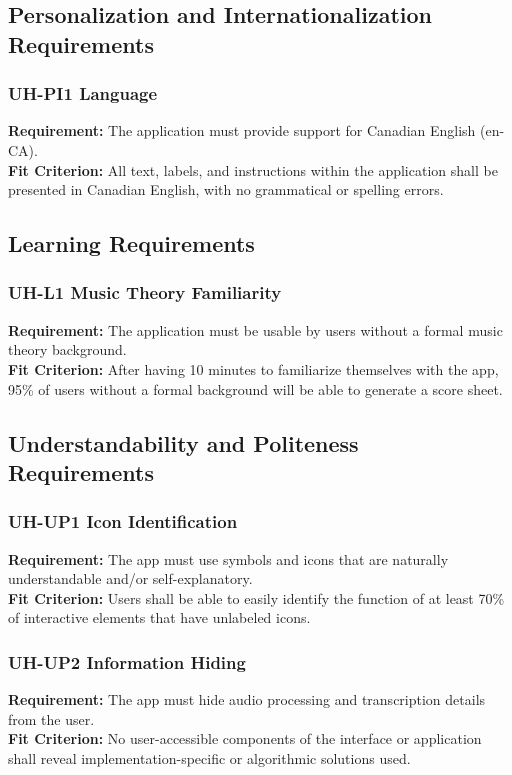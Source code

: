\documentclass[12pt]{article}
\begin{document}
\subsection{Personalization and Internationalization Requirements}
\subsubsection*{UH-PI1 Language} \label{UH-PI1}
\textbf{Requirement:} The application must provide support for Canadian English (en-CA).\\
\textbf{Fit Criterion:} All text, labels, and instructions within the application 
shall be presented in Canadian English, with no grammatical or spelling errors.
\subsection{Learning Requirements}
\subsubsection*{UH-L1 Music Theory Familiarity} \label{UH-L1}
\textbf{Requirement:} The application must be usable by users without a formal music theory background. \\
\textbf{Fit Criterion:} After having 10 minutes to familiarize themselves with the app, 95\% of users without a 
formal background will be able to generate a score sheet.
\subsection{Understandability and Politeness Requirements}
\subsubsection*{UH-UP1 Icon Identification} \label{UH-UP1}
\textbf{Requirement:} The app must use symbols and icons that are naturally understandable and/or self-explanatory.\\
\textbf{Fit Criterion:} Users shall be able to easily identify the function of at least 70\% of interactive elements
that have unlabeled icons.
\subsubsection*{UH-UP2 Information Hiding} \label{UH-UP2}
\textbf{Requirement:} The app must hide audio processing and transcription details from the user.\\
\textbf{Fit Criterion:} No user-accessible components of the interface or application shall reveal
implementation-specific or algorithmic solutions used.
\end{document}
